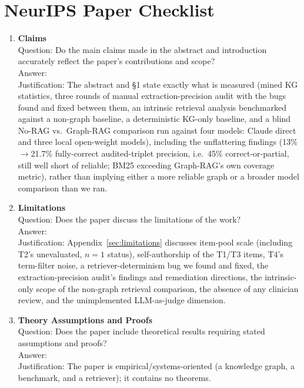 \documentclass{article}
\begin{document}
\section*{NeurIPS Paper Checklist}

\begin{enumerate}

\item \textbf{Claims}\\
    Question: Do the main claims made in the abstract and introduction accurately reflect the paper's contributions and scope?\\
    Answer: \answerYes{}\\
    Justification: The abstract and \S1 state exactly what is measured (mined KG statistics, three rounds of manual extraction-precision audit with the bugs found and fixed between them, an intrinsic retrieval analysis benchmarked against a non-graph baseline, a deterministic KG-only baseline, and a blind No-RAG vs.\ Graph-RAG comparison run against four models: Claude direct and three local open-weight models), including the unflattering findings (13\%$\to$21.7\% fully-correct audited-triplet precision, i.e.\ 45\% correct-or-partial, still well short of reliable; BM25 exceeding Graph-RAG's own coverage metric), rather than implying either a more reliable graph or a broader model comparison than we ran.

\item \textbf{Limitations}\\
    Question: Does the paper discuss the limitations of the work?\\
    Answer: \answerYes{}\\
    Justification: Appendix~\ref{sec:limitations} discusses item-pool scale (including T2's unevaluated, $n{=}1$ status), self-authorship of the T1/T3 items, T4's term-filter noise, a retriever-determinism bug we found and fixed, the extraction-precision audit's findings and remediation directions, the intrinsic-only scope of the non-graph retrieval comparison, the absence of any clinician review, and the unimplemented LLM-as-judge dimension.

\item \textbf{Theory Assumptions and Proofs}\\
    Question: Does the paper include theoretical results requiring stated assumptions and proofs?\\
    Answer: \answerNA{}\\
    Justification: The paper is empirical/systems-oriented (a knowledge graph, a benchmark, and a retriever); it contains no theorems.


\end{enumerate}
\end{document}

